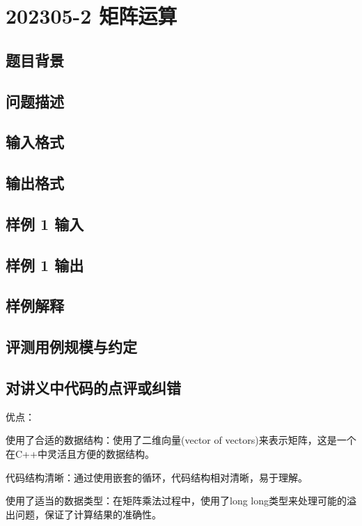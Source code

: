 \section{202305-2 矩阵运算}

\subsection{题目背景}

\subsection{问题描述}

\subsection{输入格式}

\subsection{输出格式}

\subsection{样例 1 输入}

\subsection{样例 1 输出}

\subsection{样例解释}

\subsection{评测用例规模与约定}

\subsection{对讲义中代码的点评或纠错}
 
优点：

使用了合适的数据结构：使用了二维向量(vector of vectors)来表示矩阵，这是一个在C++中灵活且方便的数据结构。

代码结构清晰：通过使用嵌套的循环，代码结构相对清晰，易于理解。

使用了适当的数据类型：在矩阵乘法过程中，使用了long long类型来处理可能的溢出问题，保证了计算结果的准确性。

